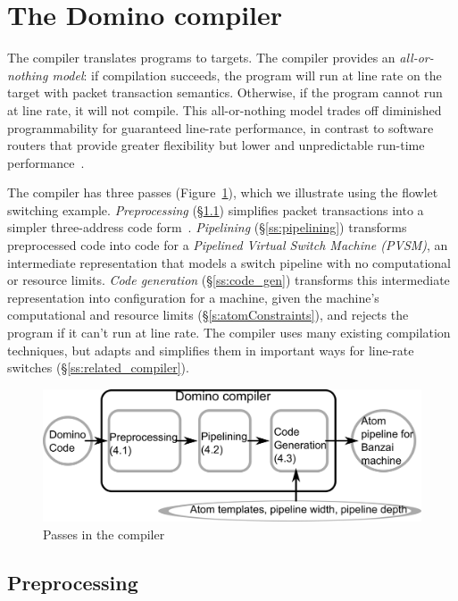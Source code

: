 \section{The Domino compiler}
\label{s:compiler}

The \pktlanguage compiler translates \pktlanguage programs to \absmachine
targets. The compiler provides an {\em all-or-nothing model}: if compilation
succeeds, the program will run at line rate on the target with packet
transaction semantics. Otherwise, if the program cannot run at line rate, it
will not compile. This all-or-nothing model trades off diminished
programmability for guaranteed line-rate performance, in contrast to software
routers that provide greater flexibility but lower and unpredictable run-time
performance~\cite{dobrescu2012}.

The \pktlanguage compiler has three passes (Figure~\ref{fig:passes}), which we
illustrate using the flowlet switching example.  \textit{Preprocessing}
(\S\ref{ss:preprocessing}) simplifies packet transactions into a simpler
three-address code form~\cite{tac}.
\textit{Pipelining} (\S\ref{ss:pipelining}) transforms preprocessed code into
code for a \textit{Pipelined Virtual Switch Machine (PVSM)}, an intermediate
representation that models a switch pipeline with no computational or resource
limits. \textit{Code generation} (\S\ref{ss:code_gen}) transforms this
intermediate representation into configuration for a \absmachine machine, given
the machine's computational and resource limits (\S\ref{s:atomConstraints}),
and rejects the program if it can't run at line rate.  The \pktlanguage
compiler uses many existing compilation techniques, but adapts and simplifies
them in important ways for line-rate switches (\S\ref{ss:related_compiler}).

\begin{figure}[!t]
  \includegraphics[width=\columnwidth]{compiler.pdf}
  \caption{Passes in the \pktlanguage compiler}
  \label{fig:passes}
\end{figure}

\subsection{Preprocessing}
\label{ss:preprocessing}

